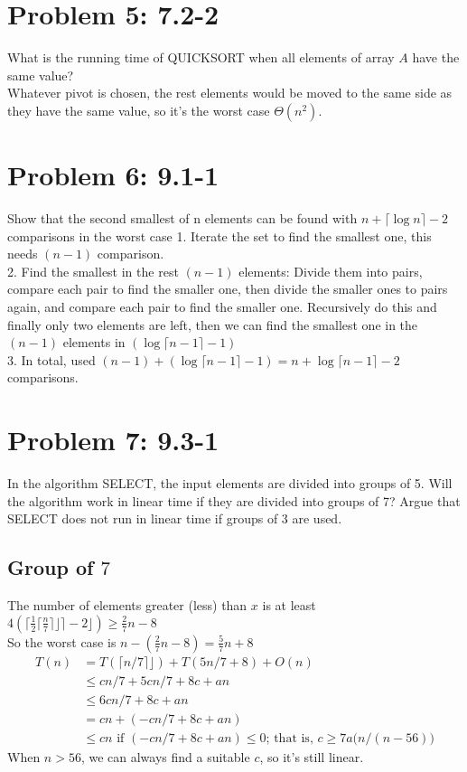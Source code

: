 \documentclass[a4paper]{article}
\begin{document}
\section{Problem 5: 7.2-2} 
What is the running time of QUICKSORT when all elements of array $A$ have the same value?\\
Whatever pivot is chosen, the rest elements would be moved to the same side as they have the same value, so it's the worst case $\Theta(n^2)$.

\section{Problem 6: 9.1-1}
Show that the second smallest of n elements can be found with $n+\lceil{\log{n}}\rceil-2 $ comparisons in the worst case
1. Iterate the set to find the smallest one, this needs $(n-1)$ comparison.\\
2. Find the smallest in the rest $(n-1)$ elements: Divide them into pairs, compare each pair to find the smaller one, then divide the smaller ones to pairs again, and compare each pair to find the smaller one. Recursively do this and finally only two elements are left, then we can find the smallest one in the $(n-1)$ elements in $(\log {\lceil{n-1}\rceil} - 1)$\\
3. In total, used $(n-1) + (\log {\lceil{n-1}\rceil} - 1)=n+\log {\lceil{n-1}\rceil}-2$ comparisons.

\section{Problem 7: 9.3-1} 
In the algorithm SELECT, the input elements are divided into groups of 5. Will the algorithm work in linear time if they are divided into groups of 7? Argue that SELECT does not run in linear time if groups of 3 are used.
\subsection{Group of $7$}
    The number of elements greater (less) than $x$ is at least $4(\bigl\lceil \frac{1}{2}\lceil{\frac{n}{7}}\rceil⌋\bigr\rceil-2⌋)\geq \frac{2}{7}n-8$\\
    So the worst case is $n-(\frac{2}{7}n-8)=\frac{5}{7}n+8$
    \begin{align*}
        T(n) & = T(\lceil{n/7}\rceil⌋)+T(5n/7+8) + O(n) \\
        & \leq cn/7+5cn/7+8c + an \\
        & \leq 6cn/7+8c + an \\
        & = cn + (-cn/7+8c+an)\\
        & \leq cn \text{ if } (-cn/7+8c+an)\leq0 \text{; that is, } c\geq 7a\bigl(n/(n-56)\bigr)
    \end{align*}
    When $n>56$, we can always find a suitable $c$, so it's still linear.
    
\end{document}
